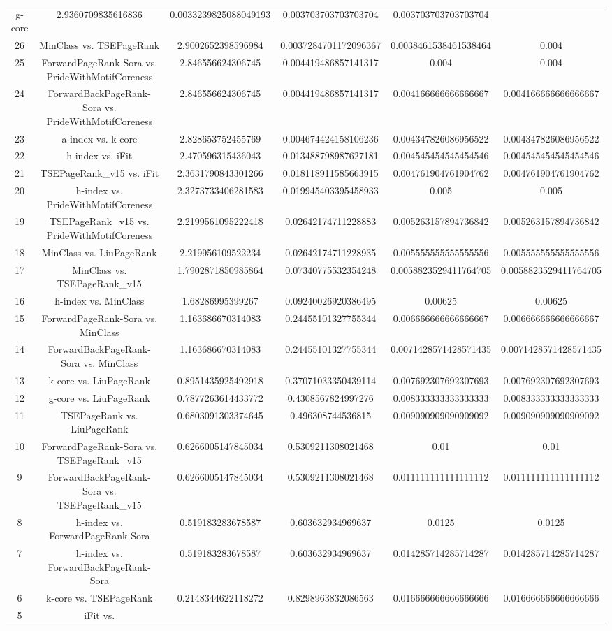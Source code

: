 \documentclass[a4paper,10pt]{article}
\begin{document}
\begin{landscape}
\begin{table}[!htp]
\begin{tabular}{cccccc}
g-core&2.9360709835616836&0.0033239825088049193&0.003703703703703704&0.003703703703703704\\26&MinClass vs. TSEPageRank&2.9002652398596984&0.0037284701172096367&0.0038461538461538464&0.004\\25&ForwardPageRank-Sora vs. PrideWithMotifCoreness&2.846556624306745&0.004419486857141317&0.004&0.004\\24&ForwardBackPageRank-Sora vs. PrideWithMotifCoreness&2.846556624306745&0.004419486857141317&0.004166666666666667&0.004166666666666667\\23&a-index vs. k-core&2.828653752455769&0.004674424158106236&0.004347826086956522&0.004347826086956522\\22&h-index vs. iFit&2.470596315436043&0.013488798987627181&0.004545454545454546&0.004545454545454546\\21&TSEPageRank_v15 vs. iFit&2.3631790843301266&0.018118911585663915&0.004761904761904762&0.004761904761904762\\20&h-index vs. PrideWithMotifCoreness&2.3273733406281583&0.019945403395458933&0.005&0.005\\19&TSEPageRank_v15 vs. PrideWithMotifCoreness&2.2199561095222418&0.02642174711228883&0.005263157894736842&0.005263157894736842\\18&MinClass vs. LiuPageRank&2.219956109522234&0.02642174711228935&0.005555555555555556&0.005555555555555556\\17&MinClass vs. TSEPageRank_v15&1.7902871850985864&0.07340775532354248&0.0058823529411764705&0.0058823529411764705\\16&h-index vs. MinClass&1.68286995399267&0.09240026920386495&0.00625&0.00625\\15&ForwardPageRank-Sora vs. MinClass&1.163686670314083&0.24455101327755344&0.006666666666666667&0.006666666666666667\\14&ForwardBackPageRank-Sora vs. MinClass&1.163686670314083&0.24455101327755344&0.0071428571428571435&0.0071428571428571435\\13&k-core vs. LiuPageRank&0.8951435925492918&0.37071033350439114&0.007692307692307693&0.007692307692307693\\12&g-core vs. LiuPageRank&0.7877263614433772&0.4308567824997276&0.008333333333333333&0.008333333333333333\\11&TSEPageRank vs. LiuPageRank&0.6803091303374645&0.496308744536815&0.009090909090909092&0.009090909090909092\\10&ForwardPageRank-Sora vs. TSEPageRank_v15&0.6266005147845034&0.5309211308021468&0.01&0.01\\9&ForwardBackPageRank-Sora vs. TSEPageRank_v15&0.6266005147845034&0.5309211308021468&0.011111111111111112&0.011111111111111112\\8&h-index vs. ForwardPageRank-Sora&0.519183283678587&0.603632934969637&0.0125&0.0125\\7&h-index vs. ForwardBackPageRank-Sora&0.519183283678587&0.603632934969637&0.014285714285714287&0.014285714285714287\\6&k-core vs. TSEPageRank&0.2148344622118272&0.8298963832086563&0.016666666666666666&0.016666666666666666\\5&iFit vs. 
\end{tabular}
\end{table}
\end{landscape}
\end{document}
